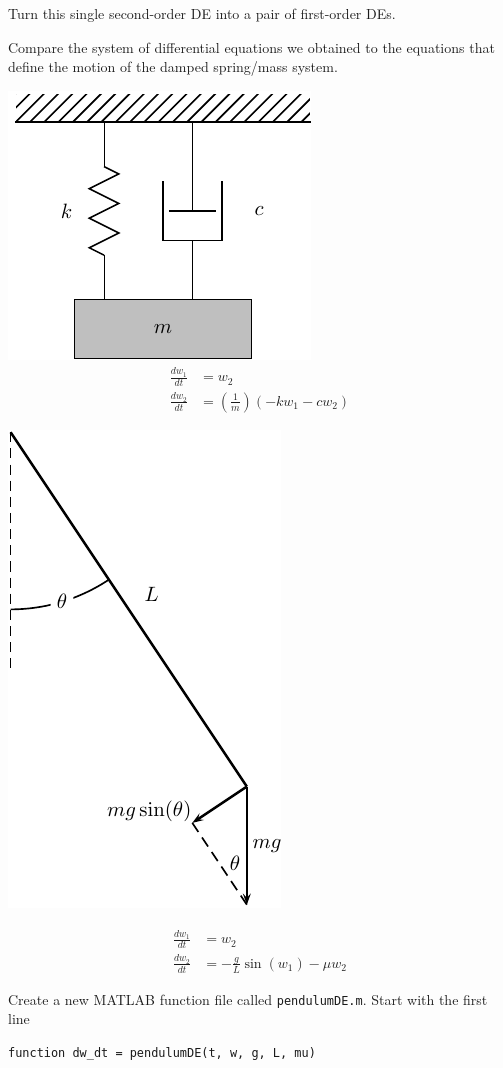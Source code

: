\problem Turn this single second-order DE into a pair of first-order
DEs.

\newpage
\problem Compare the system of differential equations we obtained to
the equations that define the motion of the damped spring/mass system.

\begin{minipage}[t]{0.45\linewidth}
\vspace{0pt}
\includegraphics[width=0.4\linewidth]{graphics/notes_08_hanging_mass}
\begin{align*}
  \frac{dw_1}{dt} & = w_2 \\
  \frac{dw_2}{dt} & = \left(\frac{1}{m}\right) (- k w_1-c w_2)
\end{align*}
\end{minipage}
\begin{minipage}[t]{0.45\linewidth}
\vspace{0pt}
\begin{center}
\includegraphics[width=0.2\linewidth]{graphics/notes_09_pendulum_diagram}
\end{center}
\begin{align*}
  \frac{d w_1}{dt} & = w_2 \\
  \frac{d w_2}{dt} & = -\frac{g}{L}\sin(w_1)  - \mu w_2
\end{align*}
\end{minipage}

\newpage


\problem Create a new MATLAB function file called \texttt{pendulumDE.m}.
Start with the first line
\begin{verbatim}
function dw_dt = pendulumDE(t, w, g, L, mu) 
\end{verbatim}

